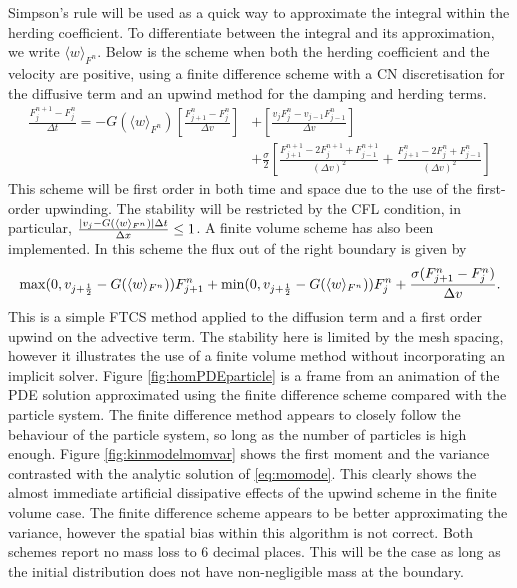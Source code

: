     Simpson's rule will be used as a quick way to approximate the integral within the herding coefficient. To differentiate between the integral and its approximation, we write \(\langle w\rangle_{F^n}\). Below is the scheme when both the herding coefficient and the velocity are positive, using a finite difference scheme with a CN discretisation for the diffusive term and an upwind method for the damping and herding terms.
    \begin{equation*}
    \begin{split}
    \frac{F_j^{n+1} - F_j^n}{\Delta t} = 	-G(\langle w\rangle_{F^n})\left[ \frac{F^n_{j+1} - F^n_{j}}{\Delta v}\right] &+\left[ \frac{v_{j}F^n_{j} - v_{j-1}F^n_{j-1}}{\Delta v}\right]\\ &+ \frac{\sigma}{2}\left[ \frac{F^{n+1}_{j+1} - 2F^{n+1}_j + F^{n+1}_{j-1}}{(\Delta v)^2} + \frac{F^{n}_{j+1} - 2F^{n}_j + F^{n}_{j-1}}{(\Delta v)^2}\right] 	 
    \end{split}
    \end{equation*}
    This scheme will be first order in both time and space due to the use of the first-order upwinding. The stability will be restricted by the CFL condition, in particular, $\frac{|v_j-G(\langle w\rangle_{F^n})|\Delta t}{\Delta x} \leq 1$. A finite volume scheme has also been implemented. In this scheme the flux out of the right boundary is given by 
     \[ \max(0, v_{j+\frac{1}{2}}-G(\langle w\rangle_{F^n}))F^n_{j+1} + \min(0, v_{j+\frac{1}{2}}-G(\langle w\rangle_{F^n}))F^n_j + \frac{\sigma(F^n_{j+1} - F^n_j)}{\Delta v}.
     \]
     This is a simple FTCS method applied to the diffusion term and a first order upwind on the advective term. The stability here is limited by the mesh spacing, however it illustrates the use of a finite volume method without incorporating an implicit solver. Figure \ref{fig:homPDEparticle} is a frame from an animation of the PDE solution approximated using the finite difference scheme compared with the particle system. The finite difference method appears to closely follow the behaviour of the particle system, so long as the number of particles is high enough. Figure \ref{fig:kinmodelmomvar} shows the first moment and the variance contrasted with the analytic solution of \eqref{eq:momode}. This clearly shows the almost immediate artificial dissipative effects of the upwind scheme in the finite volume case. The finite difference scheme appears to be better approximating the variance, however the spatial bias within this algorithm is not correct. Both schemes report no mass loss to 6 decimal places. This will be the case as long as the initial distribution does not have non-negligible mass at the boundary.
     
